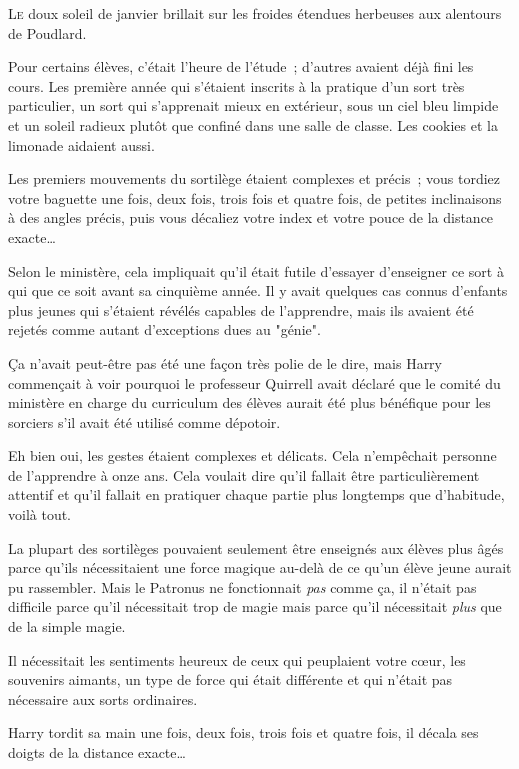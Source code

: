 
\lettrine{L}{e} doux soleil de janvier brillait sur les froides étendues herbeuses aux alentours de Poudlard.

Pour certains élèves, c'était l'heure de l'étude~; d'autres avaient déjà fini les cours. Les première année qui s'étaient inscrits à la pratique d'un sort très particulier, un sort qui s'apprenait mieux en extérieur, sous un ciel bleu limpide et un soleil radieux plutôt que confiné dans une salle de classe. Les cookies et la limonade aidaient aussi.

Les premiers mouvements du sortilège étaient complexes et précis~; vous tordiez votre baguette une fois, deux fois, trois fois et quatre fois, de petites inclinaisons à des angles précis, puis vous décaliez votre index et votre pouce de la distance exacte…

Selon le ministère, cela impliquait qu'il était futile d'essayer d'enseigner ce sort à qui que ce soit avant sa cinquième année. Il y avait quelques cas connus d'enfants plus jeunes qui s'étaient révélés capables de l'apprendre, mais ils avaient été rejetés comme autant d'exceptions dues au "génie".

Ça n'avait peut-être pas été une façon très polie de le dire, mais Harry commençait à voir pourquoi le professeur Quirrell avait déclaré que le comité du ministère en charge du curriculum des élèves aurait été plus bénéfique pour les sorciers s'il avait été utilisé comme dépotoir.

Eh bien oui, les gestes étaient complexes et délicats. Cela n'empêchait personne de l'apprendre à onze ans. Cela voulait dire qu'il fallait être particulièrement attentif et qu'il fallait en pratiquer chaque partie plus longtemps que d'habitude, voilà tout.

La plupart des sortilèges pouvaient seulement être enseignés aux élèves plus âgés parce qu'ils nécessitaient une force magique au-delà de ce qu'un élève jeune aurait pu rassembler. Mais le Patronus ne fonctionnait \emph{pas} comme ça, il n'était pas difficile parce qu'il nécessitait trop de magie mais parce qu'il nécessitait \emph{plus} que de la simple magie.

Il nécessitait les sentiments heureux de ceux qui peuplaient votre cœur, les souvenirs aimants, un type de force qui était différente et qui n'était pas nécessaire aux sorts ordinaires.

Harry tordit sa main une fois, deux fois, trois fois et quatre fois, il décala ses doigts de la distance exacte…

